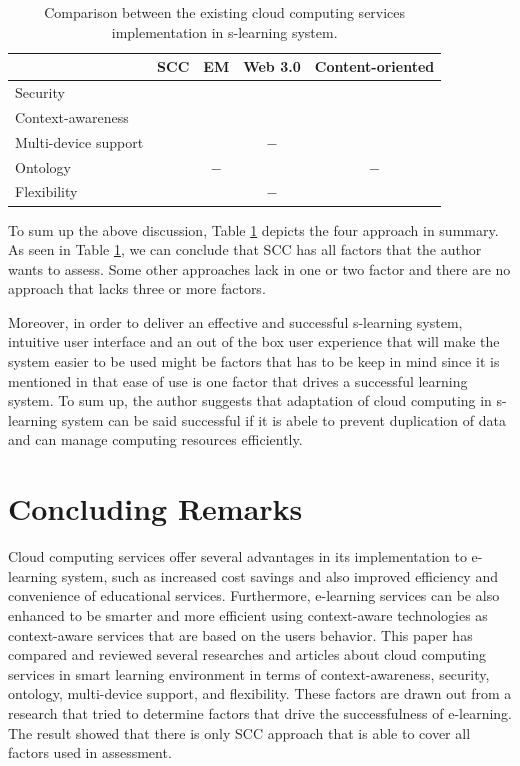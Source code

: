 \documentclass[journal]{vgtc}
\newcommand{\cmark}{\ding{51}}%
\begin{document}
\begin{table}[htb]
  \caption{Comparison between the existing cloud computing services implementation in s-learning system.}
  \label{tab:comparison}
  \scriptsize
  \begin{center}
  \begin{tabular}{lcccc}
     & SCC & EM & Web 3.0 & Content-oriented \\
    \hline
    Security & \cmark & \cmark & \cmark & \cmark \\
    Context-awareness & \cmark & \cmark & \cmark & \cmark \\
    Multi-device support & \cmark & \cmark & $-$ & \cmark \\
    Ontology & \cmark & $-$ & \cmark &  $-$ \\
    Flexibility & \cmark & \cmark &  $-$ & \cmark
  \end{tabular}
  \end{center}
\end{table}

To sum up the above discussion, Table \ref{tab:comparison} depicts the four approach in summary. As seen in Table \ref{tab:comparison}, we can conclude that SCC has all factors that the author wants to assess. Some other approaches lack in one or two factor and there are no approach that lacks three or more factors.

Moreover, in order to deliver an effective and successful s-learning system, intuitive user interface and an out of the box user experience that will make the system easier to be used might be factors that has to be keep in mind since it is mentioned in \cite{Sun2008} that ease of use is one factor that drives a successful learning system. To sum up, the author suggests that adaptation of cloud computing in s-learning system can be said successful if it is abele to prevent duplication of data and can manage computing resources efficiently.

\section{Concluding Remarks}
Cloud computing services offer several advantages in its implementation to e-learning system, such as increased cost savings and also improved efficiency and convenience of educational services. Furthermore, e-learning services can be also enhanced to be smarter and more efficient using context-aware technologies as context-aware services that are based on the users behavior. This paper has compared and reviewed several researches and articles about cloud computing services in smart learning environment in terms of context-awareness, security, ontology, multi-device support, and flexibility. These factors are drawn out from a research that tried to determine factors that drive the successfulness of e-learning. The result showed that there is only SCC approach that is able to cover all factors used in assessment.
\end{document}
